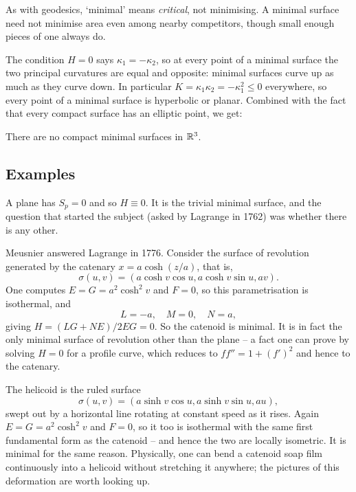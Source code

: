 \documentclass[a4paper]{scrartcl}
\begin{document}
\begin{remark}
    As with geodesics, `minimal' means \emph{critical}, not minimising. A minimal surface need not minimise area even among nearby competitors, though small enough pieces of one always do.
\end{remark}

The condition $H = 0$ says $\kappa_1 = -\kappa_2$, so at every point of a minimal surface the two principal curvatures are equal and opposite: minimal surfaces curve up as much as they curve down. In particular $K = \kappa_1\kappa_2 = -\kappa_1^2 \leq 0$ everywhere, so every point of a minimal surface is hyperbolic or planar. Combined with the fact that every compact surface has an elliptic point, we get:

\begin{corollary}
    There are no compact minimal surfaces in $\mathbb{R}^3$.
\end{corollary}

\subsection{Examples}

\begin{example}
    A plane has $S_p = 0$ and so $H \equiv 0$. It is the trivial minimal surface, and the question that started the subject (asked by Lagrange in 1762) was whether there is any other.
\end{example}

\begin{example}
    Meusnier answered Lagrange in 1776. Consider the surface of revolution generated by the catenary $x = a\cosh(z/a)$, that is,
    $$
    \sigma(u,v) = \left(a\cosh v \cos u, a\cosh v\sin u, av\right).
    $$
    One computes $E = G = a^2\cosh^2 v$ and $F = 0$, so this parametrisation is isothermal, and
    $$
    L = -a, \quad M = 0, \quad N = a,
    $$
    giving $H = (LG + NE)/2EG = 0$. So the catenoid is minimal. It is in fact the only minimal surface of revolution other than the plane -- a fact one can prove by solving $H = 0$ for a profile curve, which reduces to $f f'' = 1 + (f')^2$ and hence to the catenary.
\end{example}

\begin{example}
    The helicoid is the ruled surface
    $$
    \sigma(u,v) = \left(a\sinh v\cos u, a \sinh v\sin u, au\right),
    $$
    swept out by a horizontal line rotating at constant speed as it rises. Again $E = G = a^2\cosh^2 v$ and $F = 0$, so it too is isothermal with the same first fundamental form as the catenoid -- and hence the two are locally isometric. It is minimal for the same reason. Physically, one can bend a catenoid soap film continuously into a helicoid without stretching it anywhere; the pictures of this deformation are worth looking up.
\end{example}
\end{document}
